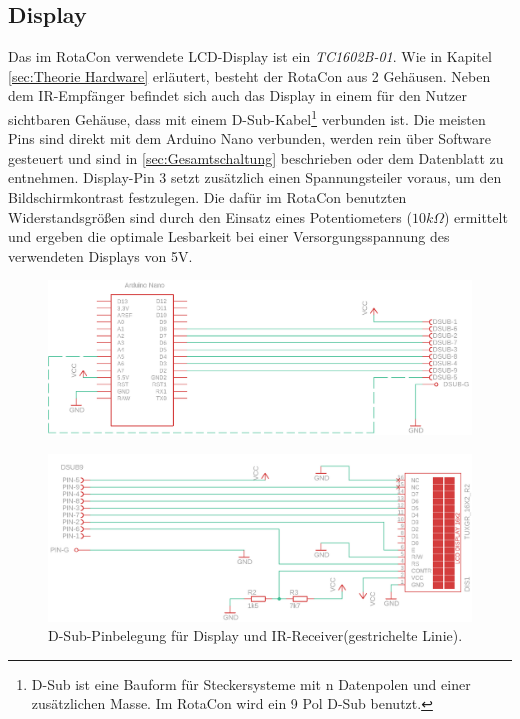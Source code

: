 \documentclass[11pt, titlepage]{report}
\begin{document}
			\subsection{Display}
			\label{sec:Display}
				Das im RotaCon verwendete LCD-Display ist ein \textit{TC1602B-01}. Wie in Kapitel \ref{sec:Theorie Hardware} erläutert, besteht der RotaCon aus 2 Gehäusen. Neben dem IR-Empfänger befindet sich auch das Display in einem für den Nutzer sichtbaren Gehäuse, dass mit einem D-Sub-Kabel\footnote{D-Sub ist eine Bauform für Steckersysteme mit n Datenpolen und einer zusätzlichen Masse. Im RotaCon wird ein 9 Pol D-Sub benutzt.} verbunden ist. Die meisten Pins sind direkt mit dem Arduino Nano verbunden, werden rein über Software gesteuert und sind in \ref{sec:Gesamtschaltung} beschrieben oder dem Datenblatt zu entnehmen. Display-Pin 3 setzt zusätzlich einen Spannungsteiler voraus, um den Bildschirmkontrast festzulegen. Die dafür im RotaCon benutzten Widerstandsgrößen sind durch den Einsatz eines Potentiometers ($10k\Omega$) ermittelt und ergeben die optimale Lesbarkeit bei einer Versorgungsspannung des verwendeten Displays von 5V.
				\begin{figure}[htbp]
					\includegraphics[width=\linewidth]{./img/dsub2.png}
					\label{fig:imgDisplay}
				\end{figure}
				\begin{figure}[htbp]
					\includegraphics[width=\linewidth]{./img/display2.png}
					\caption[D-Sub-Pinbelegung für Display und IR-Receiver]{D-Sub-Pinbelegung für Display und IR-Receiver(gestrichelte Linie).
					\label{fig:imgDSUB}}
				\end{figure}
\end{document}
